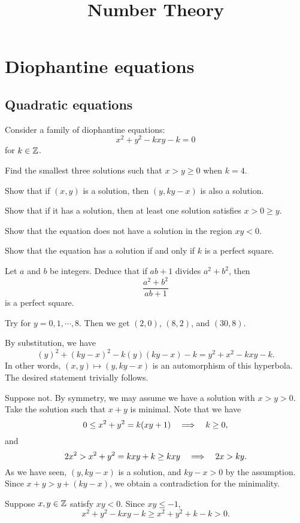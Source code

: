 \documentclass{../prb}
\title{Number Theory}
\begin{document}
\maketitle
\tableofcontents

\chapter{Diophantine equations}

\section{Quadratic equations}


\begin{prb}
Consider a family of diophantine equations:
\[x^2+y^2-kxy-k=0\]
for $k\in\mathbb{Z}$.
\begin{cond}
\item Find the smallest three solutions such that $x>y\ge0$ when $k=4$.
\item Show that if $(x,y)$ is a solution, then $(y,ky-x)$ is also a solution.
\item Show that if it has a solution, then at least one solution satisfies $x>0\ge y$.
\item Show that the equation does not have a solution in the region $xy<0$.
\item Show that the equation has a solution if and only if $k$ is a perfect square.
\item Let $a$ and $b$ be integers. Deduce that if $ab+1$ divides $a^2+b^2$, then \[\frac{a^2+b^2}{ab+1}\]is a perfect square.
\end{cond}
\end{prb}
\begin{sol}
\item
Try for $y=0,1,\cdots,8$.
Then we get $(2,0)$, $(8,2)$, and $(30,8)$.
\item
By substitution, we have
\[(y)^2+(ky-x)^2-k(y)(ky-x)-k=y^2+x^2-kxy-k.\]
In other words, $(x,y)\mapsto(y,ky-x)$ is an automorphism of this hyperbola.
The desired statement trivially follows.
\item
Suppose not.
By symmetry, we may assume we have a solution with $x>y>0$.
Take the solution such that $x+y$ is minimal.
Note that we have
\[0\le x^2+y^2=k(xy+1)\impl k\ge0,\]
and
\[2x^2>x^2+y^2=kxy+k\ge kxy\impl 2x>ky.\]
As we have seen, $(y,ky-x)$ is a solution, and $ky-x>0$ by the assumption.
Since $x+y>y+(ky-x)$, we obtain a contradiction for the minimality.
\item
Suppose $x,y\in\mathbb{Z}$ satisfy $xy<0$.
Since $xy\le-1$, \[x^2+y^2-kxy-k\ge x^2+y^2+k-k>0.\]
\item
\end{sol}
\end{document}
